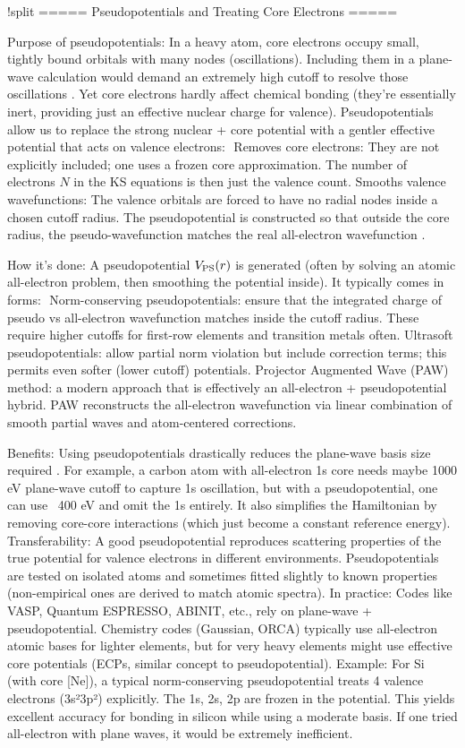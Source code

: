 !split
===== Pseudopotentials and Treating Core Electrons =====

Purpose of pseudopotentials: In a heavy atom, core electrons occupy small, tightly bound orbitals with many nodes (oscillations). Including them in a plane-wave calculation would demand an extremely high cutoff to resolve those oscillations  . Yet core electrons hardly affect chemical bonding (they’re essentially inert, providing just an effective nuclear charge for valence). Pseudopotentials allow us to replace the strong nuclear + core potential with a gentler effective potential that acts on valence electrons: 
Removes core electrons: They are not explicitly included; one uses a frozen core approximation. The number of electrons $N$ in the KS equations is then just the valence count.
Smooths valence wavefunctions: The valence orbitals are forced to have no radial nodes inside a chosen cutoff radius. The pseudopotential is constructed so that outside the core radius, the pseudo-wavefunction matches the real all-electron wavefunction .

How it’s done: A pseudopotential $V_{\rm PS}(r)$ is generated (often by solving an atomic all-electron problem, then smoothing the potential inside). It typically comes in forms: 
Norm-conserving pseudopotentials: ensure that the integrated charge of pseudo vs all-electron wavefunction matches inside the cutoff radius. These require higher cutoffs for first-row elements and transition metals often.
Ultrasoft pseudopotentials: allow partial norm violation but include correction terms; this permits even softer (lower cutoff) potentials.
Projector Augmented Wave (PAW) method: a modern approach that is effectively an all-electron + pseudopotential hybrid. PAW reconstructs the all-electron wavefunction via linear combination of smooth partial waves and atom-centered corrections.

Benefits: Using pseudopotentials drastically reduces the plane-wave basis size required . For example, a carbon atom with all-electron 1s core needs maybe 1000 eV plane-wave cutoff to capture 1s oscillation, but with a pseudopotential, one can use ~400 eV and omit the 1s entirely. It also simplifies the Hamiltonian by removing core-core interactions (which just become a constant reference energy).
Transferability: A good pseudopotential reproduces scattering properties of the true potential for valence electrons in different environments. Pseudopotentials are tested on isolated atoms and sometimes fitted slightly to known properties (non-empirical ones are derived to match atomic spectra).
In practice: Codes like VASP, Quantum ESPRESSO, ABINIT, etc., rely on plane-wave + pseudopotential. Chemistry codes (Gaussian, ORCA) typically use all-electron atomic bases for lighter elements, but for very heavy elements might use effective core potentials (ECPs, similar concept to pseudopotential).
Example: For Si (with core [Ne]), a typical norm-conserving pseudopotential treats 4 valence electrons (3s²3p²) explicitly. The 1s, 2s, 2p are frozen in the potential. This yields excellent accuracy for bonding in silicon while using a moderate basis. If one tried all-electron with plane waves, it would be extremely inefficient. 

